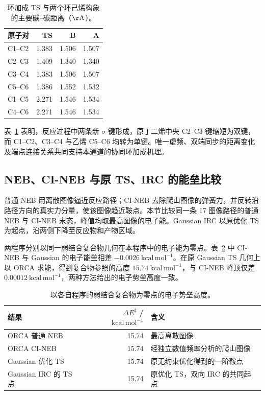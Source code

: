 \documentclass[a4paper,12pt]{article}
\newcommand{\kcalmol}{\mathrm{kcal\,mol^{-1}}}
\begin{document}
\begin{table}[htbp]
\centering\small
\caption{环加成 TS 与两个环己烯构象的主要碳--碳距离（$\mathrm{\AA}$）。}
\label{tab:bonds}
\begin{tabular}{lrrr}
\toprule
原子对 & TS & B & A\\
\midrule
C1--C2 & 1.383 & 1.506 & 1.507\\
C2--C3 & 1.409 & 1.340 & 1.340\\
C3--C4 & 1.383 & 1.506 & 1.507\\
C5--C6 & 1.386 & 1.552 & 1.532\\
C1--C5 & 2.271 & 1.546 & 1.534\\
C4--C6 & 2.271 & 1.546 & 1.534\\
\bottomrule
\end{tabular}
\end{table}
表~\ref{tab:bonds} 表明，反应过程中两条新 $\sigma$ 键形成，原丁二烯中央 C2--C3 键缩短为双键，而 C1--C2、C3--C4 与乙烯 C5--C6 均转为单键。唯一虚频、双端同步的距离变化及端点连接关系共同支持本通道的协同环加成机理。

\subsection{NEB、CI-NEB 与原 TS、IRC 的能垒比较}
普通 NEB 用离散图像逼近反应路径；CI-NEB 去除爬山图像的弹簧力，并反转沿路径方向的真实力分量，使该图像趋近鞍点\cite{ase-neb}。本节比较同一条 17 图像路径的普通 NEB 与 CI-NEB 末态，峰值均取最高图像的电子能。Gaussian IRC 以原优化 TS 为起点，沿两侧下降至反应物和产物区域\cite{orca-irc}。

两程序分别以同一弱结合复合物几何在本程序中的电子能为零点。表~\ref{tab:path-barriers} 中 CI-NEB 与 Gaussian 的电子能垒相差 $-0.0026\ \kcalmol$。在原 Gaussian TS 几何上以 ORCA 求能，得到复合物参照的高度 $15.74\ \kcalmol$，与 CI-NEB 峰顶仅差 $0.00012\ \kcalmol$，两种方法给出的电子势垒高度一致。

\begin{table}[htbp]
\centering\small
\caption{以各自程序的弱结合复合物为零点的电子势垒高度。}
\label{tab:path-barriers}
\begin{tabular}{lrp{6.3cm}}
\toprule
结果 & $\Delta E^\ddagger$ / $\kcalmol$ & 含义\\
\midrule
ORCA 普通 NEB & 15.74 & 最高离散图像\\
ORCA CI-NEB & 15.74 & 经独立数值频率分析的爬山图像\\
Gaussian 优化 TS & 15.74 & 原无约束优化得到的一阶鞍点\\
Gaussian IRC 的 TS 点 & 15.74 & 原优化 TS，双向 IRC 的共同起点\\
\bottomrule
\end{tabular}
\end{table}
\end{document}
